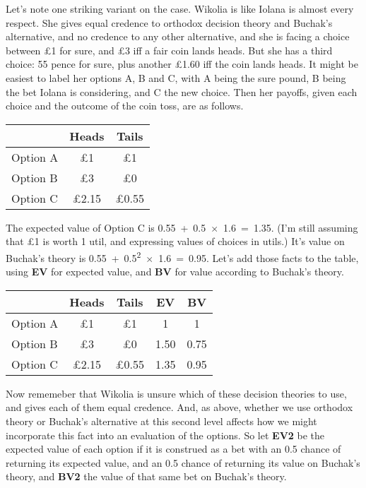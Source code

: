 \documentclass[
  10pt,
  letterpaper,
  twoside]{scrbook}
\begin{document}
Let's note one striking variant on the case. {Wikolia} is like {Iolana}
is almost every respect. She gives equal credence to orthodox decision
theory and Buchak's alternative, and no credence to any other
alternative, and she is facing a choice between £1 for sure, and £3 iff
a fair coin lands heads. But she has a third choice: 55 pence for sure,
plus another £1.60 iff the coin lands heads. It might be easiest to
label her options A, B and C, with A being the sure pound, B being the
bet {Iolana} is considering, and C the new choice. Then her payoffs,
given each choice and the outcome of the coin toss, are as follows.

\begin{longtable}[]{@{}lcc@{}}
\toprule\noalign{}
& Heads & Tails \\
\midrule\noalign{}
\endhead
\bottomrule\noalign{}
\endlastfoot
Option A & £1 & £1 \\
Option B & £3 & £0 \\
Option C & £2.15 & £0.55 \\
\end{longtable}

The expected value of Option C is 0.55~+~0.5~\(\times\)~1.6~=~1.35. (I'm
still assuming that £1 is worth 1 util, and expressing values of choices
in utils.) It's value on Buchak's theory is
0.55~+~0.5\textsuperscript{2}~\(\times\)~1.6~=~0.95. Let's add those
facts to the table, using \textbf{EV} for expected value, and
\textbf{BV} for value according to Buchak's theory.

\begin{longtable}[]{@{}lcccc@{}}
\toprule\noalign{}
& Heads & Tails & EV & BV \\
\midrule\noalign{}
\endhead
\bottomrule\noalign{}
\endlastfoot
Option A & £1 & £1 & 1 & 1 \\
Option B & £3 & £0 & 1.50 & 0.75 \\
Option C & £2.15 & £0.55 & 1.35 & 0.95 \\
\end{longtable}

Now rememeber that {Wikolia} is unsure which of these decision theories
to use, and gives each of them equal credence. And, as above, whether we
use orthodox theory or Buchak's alternative at this second level affects
how we might incorporate this fact into an evaluation of the options. So
let \textbf{EV2} be the expected value of each option if it is construed
as a bet with an 0.5 chance of returning its expected value, and an 0.5
chance of returning its value on Buchak's theory, and \textbf{BV2} the
value of that same bet on Buchak's theory.
\end{document}
